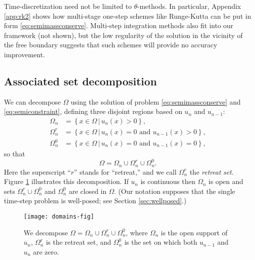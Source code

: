 \documentclass[final,leqno,onefignum,onetabnum]{siamltex1213bueler}
\begin{document}
Time-discretization need not be limited to $\theta$-methods.  In particular, Appendix \ref{app:rk2} shows how multi-stage one-step schemes like Runge-Kutta can be put in form \eqref{eq:semimassconserve}.  Multi-step integration methods also fit into our framework (not shown), but the low regularity of the solution in the vicinity of the free boundary suggests that such schemes will provide no accuracy improvement.

\subsection{Associated set decomposition}  \label{subsec:setdecompose}  We can decompose $\Omega$ using the solution of problem \eqref{eq:semimassconserve} and \eqref{eq:semiconstraint}, defining three disjoint regions based on $u_n$ and $u_{n-1}$:
\begin{align*}
\Omega_n &= \left\{x \in \Omega \,\big|\, u_n(x)>0\right\}, \\
\Omega_n^r &= \left\{x \in \Omega \,\big|\, u_n(x)=0 \text{ and } u_{n-1}(x) > 0\right\}, \\
\Omega_n^0 &= \left\{x \in \Omega \,\big|\, u_n(x)=0 \text{ and } u_{n-1}(x) = 0\right\},
\end{align*}
so that
\begin{equation}
\Omega = \Omega_n \cup \Omega_n^r \cup \Omega_n^0.  \label{eq:omegadecomposition}
\end{equation}
Here the superscript ``$r$'' stands for ``retreat,'' and we call $\Omega_n^r$ the \emph{retreat set}.  Figure \ref{fig:domains} illustrates this decomposition.  If $u_n$ is continuous then $\Omega_n$ is open and sets $\Omega_n^r \cup \Omega_n^0$ and $\Omega_n^0$ are closed in $\Omega$.  (Our notation supposes that the single time-step problem is well-posed; see Section \ref{sec:wellposed}.)

\begin{figure}[ht]
\medskip
\begin{center}
\texttt{[image: domains-fig]}
\end{center}
\caption{We decompose $\Omega = \Omega_n \cup \Omega_n^r \cup \Omega_n^0$, where $\Omega_n$ is the open support of $u_n$, $\Omega_n^r$ is the retreat set, and $\Omega_n^0$ is the set on which both $u_{n-1}$ and $u_n$ are zero.}
\label{fig:domains}
\end{figure}
\end{document}
